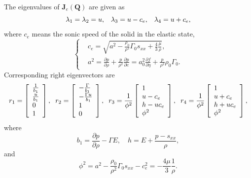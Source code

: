 \documentclass[review]{elsarticle}
\numberwithin{equation}{section}
\numberwithin{table}{section}
\begin{document}
The eigenvalues of $\mathbf{J}_{e}(\mathbf{Q})$ are given as
\begin{equation*}
  \lambda_1 =\lambda_2 = u, \hspace{0.3cm} \lambda_3 = u-c_{e}, \hspace{0.3cm} \lambda_4 = u+c_{e},
\end{equation*}
where $c_e$ means the sonic speed of the solid in the elastic state,
\begin{equation}\label{eq:c_e}
  \left\{ \begin{aligned}
      & c_e = \sqrt{a^2-\frac{\rho_0}{\rho^2}\Gamma_0 s_{xx} +\frac{4}{3}\frac{\mu}{\rho}},\\
    &   a^2 = \frac{\partial p}{\partial \rho} + \frac{p}{\rho^2}\frac{\partial p}{\partial e} = a^2_0 \frac{\partial f}{\partial \eta} + \frac{p}{\rho^2}\rho_0 \Gamma_0.
      \end{aligned} \right.
    \end{equation}
 Corresponding right eigenvectors are
\begin{equation}\label{eq:eiv}
  r_1 = \left[ \begin{array}{l}
      \frac{1}{b_1} \\
      \frac{u}{b_1} \\
      0 \\
      1 \\
    \end{array}
    \right], \hspace{0.2cm}
    r_2= \left[ \begin{array}{l}
        -\frac{\Gamma}{b_1} \\
        -\frac{\Gamma u}{b_1} \\
        1 \\
        0\\
      \end{array}
    \right], \hspace{0.2cm}
r_3 =   \frac{1}{\phi^2}\left[\begin{array}{l}
        1 \\
        u-c_e \\
        h -uc_e \\
        \phi^2
      \end{array}
    \right], \hspace{0.2cm}
r_4 = \frac{1}{\phi^2}\left[\begin{array}{l}
        1 \\
        u+c_e \\
        h +uc_e \\
        \phi^2
      \end{array}
    \right],
  \end{equation}
  where
  \begin{equation*}
    b_1 = \frac{\partial p}{\partial \rho} - \Gamma E,  \quad h = E +\frac{p-s_{xx}}{\rho},
  \end{equation*}
  and
  \begin{equation*}
    \phi^2 = a^2 -\frac{\rho_0}{\rho^2} \Gamma_0 s_{xx}-c_e^2 = -\frac{4\mu}{3}\frac{1}{\rho}.
  \end{equation*}
\end{document}
